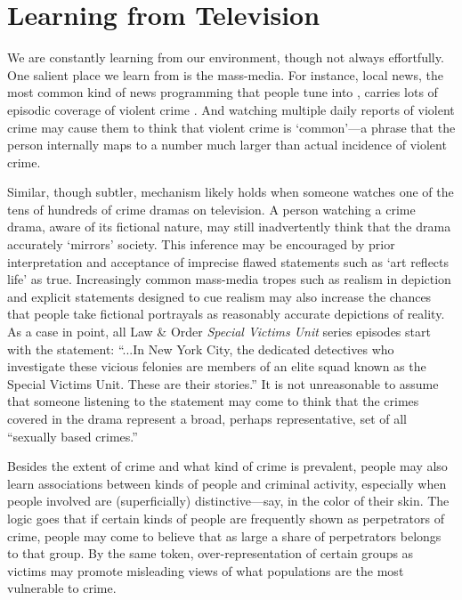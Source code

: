 \documentclass[12pt, letterpaper]{article}
\begin{document}
\section*{Learning from Television}

We are constantly learning from our environment, though not always effortfully. One salient place we learn from is the mass-media. For instance, local news, the most common kind of news programming that people tune into \citep{pew2004}, carries lots of episodic coverage of violent crime \citep[see, for instance,][]{gross2006covering, klite1997local}. And watching multiple daily reports of violent crime may cause them to think that violent crime is `common'---a phrase that the person internally maps to a number much larger than actual incidence of violent crime.

Similar, though subtler, mechanism likely holds when someone watches one of the tens of hundreds of crime dramas on television. A person watching a crime drama, aware of its fictional nature, may still inadvertently think that the drama accurately `mirrors' society. This inference may be encouraged by prior interpretation and acceptance of imprecise flawed statements such as `art reflects life' as true. Increasingly common mass-media tropes such as realism in depiction and explicit statements designed to cue realism may also increase the chances that people take fictional portrayals as reasonably accurate depictions of reality. As a case in point, all Law \& Order \textit{Special Victims Unit} series episodes start with the statement: ``...In New York City, the dedicated detectives who investigate these vicious felonies are members of an elite squad known as the Special Victims Unit. These are their stories.'' It is not unreasonable to assume that someone listening to the statement may come to think that the crimes covered in the drama represent a broad, perhaps representative, set of all ``sexually based crimes.''

Besides the extent of crime and what kind of crime is prevalent, people may also learn associations between kinds of people and criminal activity, especially when people involved are (superficially) distinctive---say, in the color of their skin. The logic goes that if certain kinds of people are frequently shown as perpetrators of crime, people may come to believe that as large a share of perpetrators belongs to that group. By the same token, over-representation of certain groups as victims may promote misleading views of what populations are the most vulnerable to crime.
\end{document}
